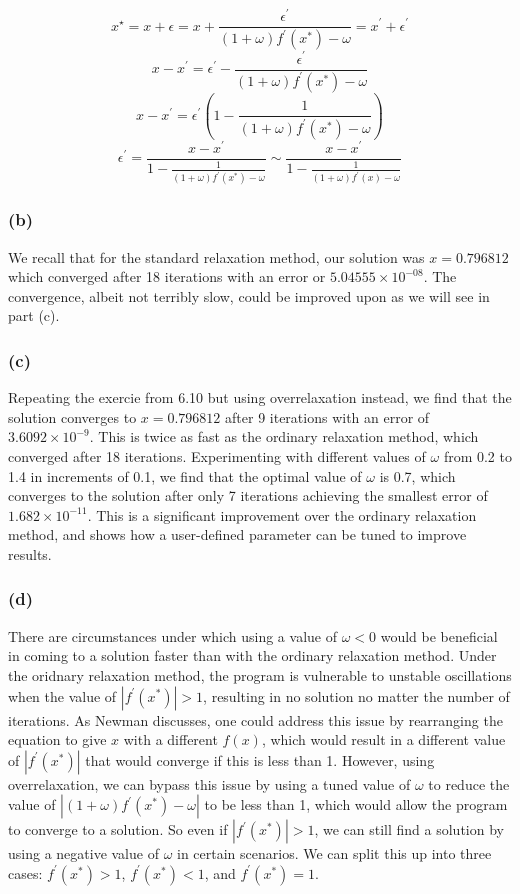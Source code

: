 \documentclass[a4paper,11pt]{article}
\begin{document}
\[ x^\star = x+ \epsilon = x + \frac{\epsilon^\prime}{(1+ \omega) f^\prime(x^*) - \omega} = x^\prime + \epsilon^\prime \]
\[ x - x^\prime = \epsilon^\prime - \frac{\epsilon^\prime}{(1+\omega) f^\prime(x^*) - \omega}\]
\[ x - x^\prime = \epsilon^\prime (1 - \frac{1}{(1+\omega) f^\prime(x^*) - \omega})\]
\[ \boxed{ \epsilon^\prime = \frac{x - x^\prime}{1 - \frac{1}{(1+\omega) f^\prime(x^*) - \omega}} \sim \frac{x - x^\prime}{1 - \frac{1}{(1+\omega) f^\prime(x) - \omega}}} \]

\subsubsection*{(b)} We recall that for the standard relaxation method, our solution was $x =  0.796812$ which converged after 18 iterations with an error or  $5.04555\times 10^{-08}$. The convergence, albeit not terribly slow, could be improved upon as we will see in part (c).

\subsubsection*{(c)} Repeating the exercie from 6.10 but using overrelaxation instead, we find that the solution converges to $x = 0.796812$ after 9 iterations with an error of $3.6092 \times 10^{-9}$. This is twice as fast as the ordinary relaxation method, which converged after 18 iterations. Experimenting with different values of $\omega$ from 0.2 to 1.4 in increments of 0.1, we find that the optimal value of $\omega$ is 0.7, which converges to the solution after only 7 iterations achieving the smallest error of $1.682 \times 10^{-11}$. This is a significant improvement over the ordinary relaxation method, and shows how a user-defined parameter can be tuned to improve results.  

\subsubsection*{(d)} There are circumstances under which using a value of $\omega<0$ would be beneficial in coming to a solution faster than with the ordinary relaxation method. Under the oridnary relaxation method, the program is vulnerable to unstable oscillations when the value of $|f^\prime(x^*)|>1$, resulting in no solution no matter the number of iterations. As Newman discusses, one could address this issue by rearranging the equation to give $x$ with a different $f(x)$, which would result in a different value of $|f^\prime(x^*)|$ that would converge if this is less than 1. However, using overrelaxation, we can bypass this issue by using a tuned value of $\omega$ to reduce the value of $|(1+\omega)f^\prime(x^*) - \omega|$ to be less than 1, which would allow the program to converge to a solution. So even if $|f^\prime(x^*)|>1$, we can still find a solution by using a negative value of $\omega$ in certain scenarios. We can split this up into three cases: $f^\prime(x^*)>1$, $f^\prime(x^*)<1$, and $f^\prime(x^*)=1$.
\end{document}
